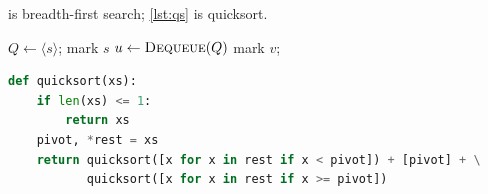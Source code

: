 \documentclass{article}
\begin{document}
 is breadth-first search; \cref{lst:qs} is quicksort.
\begin{algorithm}
\caption{Breadth-first search}\label{alg:bfs}
\begin{algorithmic}[1]
  \State $Q \gets \langle s \rangle$; mark $s$
    \State $u \gets \Call{Dequeue}{Q}$
       \State mark $v$;  \EndIf
    \EndFor
  \EndWhile
\EndProcedure
\end{algorithmic}
\end{algorithm}
\begin{lstlisting}[language=Python, caption={Quicksort}, label={lst:qs}]
def quicksort(xs):
    if len(xs) <= 1:
        return xs
    pivot, *rest = xs
    return quicksort([x for x in rest if x < pivot]) + [pivot] + \
           quicksort([x for x in rest if x >= pivot])
\end{lstlisting}
\end{document}
